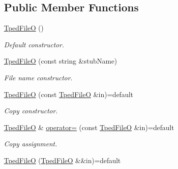 \subsection*{Public Member Functions}
\begin{DoxyCompactItemize}
\item 
\mbox{\label{classvarfiles_1_1_tped_file_o_a1dc5e1732220bd4ffbc7f442abf68fe3}} 
\hyperlink{classvarfiles_1_1_tped_file_o_a1dc5e1732220bd4ffbc7f442abf68fe3}{Tped\+FileO} ()
\begin{DoxyCompactList}\small\item\em Default constructor. \end{DoxyCompactList}\item 
\hyperlink{classvarfiles_1_1_tped_file_o_ae875b6d7d6b524f4e9ef6ff478f562f8}{Tped\+FileO} (const string \&stub\+Name)
\begin{DoxyCompactList}\small\item\em File name constructor. \end{DoxyCompactList}\item 
\mbox{\label{classvarfiles_1_1_tped_file_o_a87fafb7d9780999d1e1f47d32f2b8114}} 
\hyperlink{classvarfiles_1_1_tped_file_o_a87fafb7d9780999d1e1f47d32f2b8114}{Tped\+FileO} (const \hyperlink{classvarfiles_1_1_tped_file_o}{Tped\+FileO} \&in)=default
\begin{DoxyCompactList}\small\item\em Copy constructor. \end{DoxyCompactList}\item 
\mbox{\label{classvarfiles_1_1_tped_file_o_aeb015e6be50adf422f04bf1595e50552}} 
\hyperlink{classvarfiles_1_1_tped_file_o}{Tped\+FileO} \& \hyperlink{classvarfiles_1_1_tped_file_o_aeb015e6be50adf422f04bf1595e50552}{operator=} (const \hyperlink{classvarfiles_1_1_tped_file_o}{Tped\+FileO} \&in)=default
\begin{DoxyCompactList}\small\item\em Copy assignment. \end{DoxyCompactList}\item 
\mbox{\label{classvarfiles_1_1_tped_file_o_aa2252d074ab8d0a5e465a849a5de9159}} 
\hyperlink{classvarfiles_1_1_tped_file_o_aa2252d074ab8d0a5e465a849a5de9159}{Tped\+FileO} (\hyperlink{classvarfiles_1_1_tped_file_o}{Tped\+FileO} \&\&in)=default

\end{DoxyCompactItemize}
